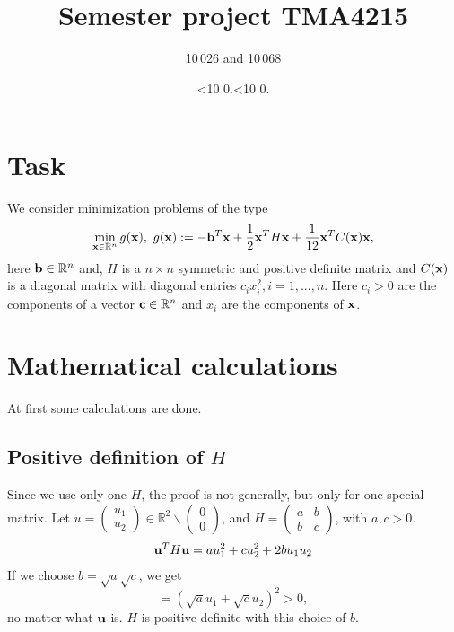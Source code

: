 \documentclass[a4paper,12pt]{article}
\newcommand{\leadingzero}[1]{\ifnum #1<10 0\the#1\else\the#1\fi}
\newcommand{\mytoday}{\leadingzero{\day}.\leadingzero{\month}.\the\year}
\begin{document}
\title{Semester project TMA4215}
\author{10\,026 and 10\,068}
\date{\mytoday}
\maketitle


\section{Task}
We consider minimization problems of the type
\begin{align*}
\min_{{\bf x} \in \mathbb{R}^n} g({\bf x}),\,\, g({\bf x}):=-{\bf b}^T{\bf x} + \frac12{\bf x}^TH{\bf x}+\frac1{12}{\bf x}^TC({\bf x}){\bf x},
\end{align*}
here ${\bf b} \in \mathbb{R}^n$ and, $H$ is a $n \times n$ symmetric and positive definite matrix and $C(\bf{x})$ is a diagonal
matrix with diagonal entries $c_i x^2_i, i = 1, . . . , n$. 
Here $c_i > 0$ are the components of a vector ${\bf c} \in \mathbb{R}^n$ 
and $x_i$ are the components of $\bf{x}$. 

\section{Mathematical calculations}
At first some calculations are done.
\subsection{Positive definition of $H$}\label{definit}
Since we use only one $H$, the proof is not generally, but only for one special matrix.
Let $u=\begin{pmatrix}u_1\\u_2\end{pmatrix}\in \mathbb{R}^2\backslash \begin{pmatrix}0\\0\end{pmatrix}$, and $H= \begin{pmatrix} a&b\\b&c\end{pmatrix}$, with $a,c>0$.
\begin{align*}
{\bf u}^TH{\bf u} = au_1^2 + cu_2^2 + 2 b u_1u_2
\end{align*}
If we choose $b = \sqrt{a}\sqrt{c}$, we get
$$ = (\sqrt{a}u_1+\sqrt{c}u_2)^2 >0,$$
no matter what ${\bf u}$ is. 
$H$ is positive definite with this choice of $b$.
\end{document}
